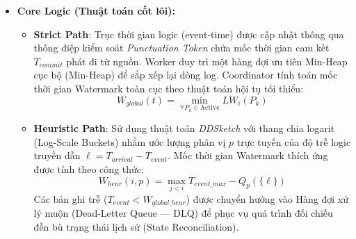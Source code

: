 \documentclass[12pt,a4paper]{article}
\begin{document}
\begin{itemize}[leftmargin=*]
    \item \textbf{Core Logic (Thuật toán cốt lõi):}
    \begin{itemize}[label={-}]
        \item \textbf{Strict Path}: Trục thời gian logic (event-time) được cập nhật thông qua thông điệp kiểm soát \textit{Punctuation Token} chứa mốc thời gian cam kết $T_{commit}$ phát đi từ nguồn. Worker duy trì một hàng đợi ưu tiên Min-Heap cục bộ (Min-Heap) để sắp xếp lại dòng log. Coordinator tính toán mốc thời gian Watermark toàn cục theo thuật toán hội tụ tối thiểu:
        {\large
        \begin{equation}
            \boxed{\displaystyle W_{global}(t) = \min_{\forall P_k \in \text{Active}} LW_i(P_k)}
        \end{equation}
        }
        \item \textbf{Heuristic Path}: Sử dụng thuật toán \textit{DDSketch} với thang chia logarit (Log-Scale Buckets) nhằm ước lượng phân vị $p$ trực tuyến của độ trễ logic truyền dẫn $\ell = T_{arrival} - T_{event}$. Mốc thời gian Watermark thích ứng được tính theo công thức:
        {\large
        \begin{equation}
            \boxed{\displaystyle W_{heur}(i, p) = \max_{j < i} T_{event\_max} - Q_p(\{\ell\})}
        \end{equation}
        }
        Các bản ghi trễ ($T_{event} < W_{global\_heur}$) được chuyển hướng vào Hàng đợi xử lý muộn (Dead-Letter Queue --- DLQ) để phục vụ quá trình đối chiếu đền bù trạng thái lịch sử (State Reconciliation).
    \end{itemize}
\end{itemize}

\vspace{0.5cm}

\end{document}
